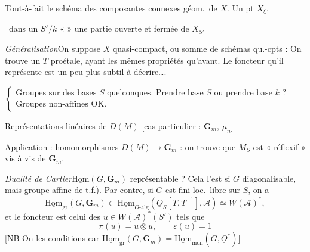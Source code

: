 \documentclass[11pt,a4paper]{article}
\begin{document}
Tout-à-fait le schéma des composantes connexes géom.\ de $X$. Un pt
\ill{} $X_\xi$, \ill{}



\ dans un $S'/k$ «  » une partie ouverte et fermée
de \ill{} $X_{S'}$

\emph{Généralisation}\quad On suppose $X$ quasi-compact, ou somme de
schémas qu.-cpts : On trouve un $T$  proétale, ayant les mêmes
propriétés qu'avant. Le foncteur qu'il représente est un peu plus subtil à
décrire….

$\left\lbrace\begin{array}{l}
  \text{Groupes sur des bases } S \text{ quelconques. Prendre base } S
  \text{ ou prendre base } k \text{ ?} \\
  \text{Groupes non-affines OK.}
\end{array}\right.$

Représentations linéaires de $D(M)$ [cas particulier : $\mathbf{G}_m$, $\mu_n$]

Application : homomorphismes $D(M) \to \mathbf{G}_m$ : on trouve que $M_S$
est « réflexif » vis à vis de $\mathbf{G}_m$.

\emph{Dualité de Cartier}\quad $\underline{\mathrm{Hom}}(G, \mathbf{G}_m)$
\struck{\ill{}} représentable ? Cela l'est si $G$ diagonalisable, mais
 
  groupe affine  de t.f.). Par
contre, si $G$ est fini loc.\ libre sur $S$, on a
\[
  \underline{\mathrm{Hom}}_{\mathrm{gr}}(G, \mathbf{G}_m) \subset
  \underline{\mathrm{Hom}}_{\underline{O}\text{-alg}}(\underline{O}_S[T, T^{-1}], \mathcal{A})
  \simeq W(\mathcal{A})^{*},
\]
et le  foncteur est celui des  $u \in W(\mathcal{A})^{*}(S')$ tels que
\[
  \pi(u) = u \otimes u , \qquad \varepsilon(u) = 1
\]
[NB On  \ill{} les conditions \ill{} car
$\underline{\mathrm{Hom}}_{\mathrm{gr}}(G, \mathbf{G}_m) =
\underline{\mathrm{Hom}}_{\mathrm{mon}}(G, \underline{O}^{*})$]
\end{document}
